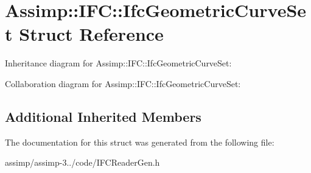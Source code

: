 \hypertarget{struct_assimp_1_1_i_f_c_1_1_ifc_geometric_curve_set}{\section{Assimp\+:\+:I\+F\+C\+:\+:Ifc\+Geometric\+Curve\+Set Struct Reference}
\label{struct_assimp_1_1_i_f_c_1_1_ifc_geometric_curve_set}
}


Inheritance diagram for Assimp\+:\+:I\+F\+C\+:\+:Ifc\+Geometric\+Curve\+Set\+:


Collaboration diagram for Assimp\+:\+:I\+F\+C\+:\+:Ifc\+Geometric\+Curve\+Set\+:
\subsection*{Additional Inherited Members}


The documentation for this struct was generated from the following file\+:\begin{DoxyCompactItemize}
\item 
assimp/assimp-\/3../code/I\+F\+C\+Reader\+Gen.\+h\end{DoxyCompactItemize}
